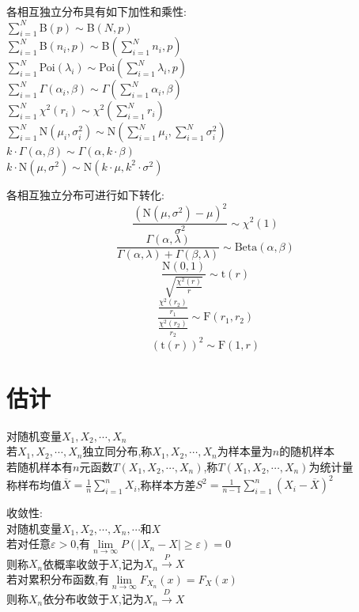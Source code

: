 \begin{dingli}
各相互独立分布具有如下加性和乘性:\\
$\sum\limits_{i=1}^{N}$B$(p)\sim$B$(N,p)$\\
$\sum\limits_{i=1}^{N}$B$(n_i,p)\sim$B$(\sum\limits_{i=1}^{N}n_i,p)$\\
$\sum\limits_{i=1}^{N}$Poi$(\lambda_i)\sim$Poi$(\sum\limits_{i=1}^{N}\lambda_i,p)$\\
$\sum\limits_{i=1}^{N}\Gamma(\alpha_i,\beta)\sim\Gamma(\sum\limits_{i=1}^{N}\alpha_i,\beta)$\\
$\sum\limits_{i=1}^{N}\chi^2(r_i)\sim\chi^2(\sum\limits_{i=1}^{N}r_i)$\\
$\sum\limits_{i=1}^{N}$N$(\mu_i,\sigma_i^2)\sim$N$(\sum\limits_{i=1}^{N}\mu_i,\sum\limits_{i=1}^{N}\sigma_i^2)$\\
$k\cdot \Gamma(\alpha,\beta)\sim\Gamma(\alpha,k\cdot \beta)$\\
$k\cdot$N$(\mu,\sigma^2)\sim$N$(k\cdot\mu,k^2\cdot\sigma^2)$
\end{dingli}

\begin{dingli}
各相互独立分布可进行如下转化:\\
\[\frac{(\text{N}(\mu,\sigma^2)-\mu)^2}{\sigma^2}\sim \chi^2(1)\]
\[\frac{\Gamma(\alpha,\lambda)}{\Gamma(\alpha,\lambda)+\Gamma(\beta,\lambda)}\sim\text{Beta}(\alpha,\beta)\]
\[\frac{\text{N}(0,1)}{\sqrt{\frac{\chi^2(r)}{r}}}\sim \text{t}(r)\]
\[\frac{\frac{\chi^2(r_2)}{r_1}}{\frac{\chi^2(r_2)}{r_2}}\sim\text{F}(r_1,r_2)\]
\[(\text{t}(r))^2\sim\text{F}(1,r)\]
\end{dingli}

\chapter{估计}

\begin{dingyi}
对随机变量$X_1,X_2,\cdots,X_n$\\
若$X_1,X_2,\cdots,X_n$独立同分布,称$X_1,X_2,\cdots,X_n$为样本量为$n$的随机样本\\
若随机样本有$n$元函数$T(X_1,X_2,\cdots,X_n)$,称$T(X_1,X_2,\cdots,X_n)$为统计量\\
称样布均值$\overline{X}=\frac{1}{n}\sum\limits_{i=1}^{n}X_i$,称样本方差$S^2=\frac{1}{n-1}\sum\limits_{i=1}^{n}(X_i-\overline{X})^2$
\end{dingyi}

\begin{dingyi}
收敛性:\\
对随机变量$X_1,X_2,\cdots,X_n,\cdots$和$X$\\
若对任意$\varepsilon>0$,有$\lim\limits_{n\to\infty}P(|X_n-X|\geq \varepsilon)=0$\\
则称$X_n$依概率收敛于$X$,记为$X_n\stackrel{P}{\rightarrow}X$\\
若对累积分布函数,有$\lim\limits_{n\to\infty}F_{X_n}(x)=F_{X}(x)$\\
则称$X_n$依分布收敛于$X$,记为$X_n\stackrel{D}{\rightarrow}X$\\
\end{dingyi}


